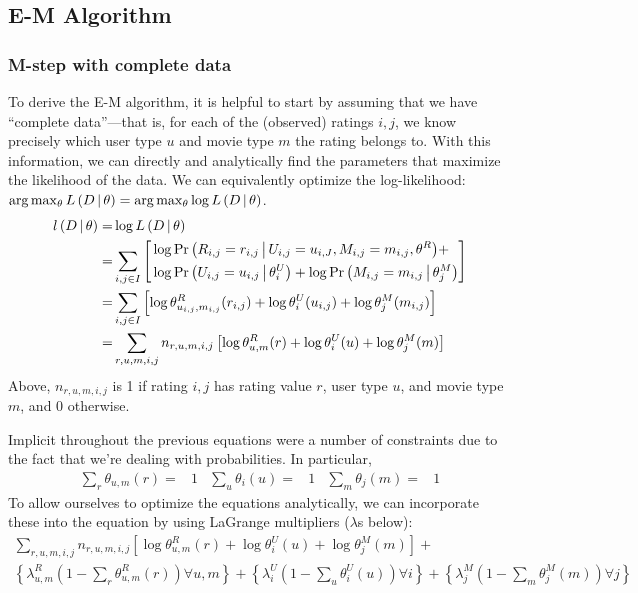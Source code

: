 \documentclass{article}
\begin{document}
\subsection{E-M Algorithm}

\subsubsection{M-step with complete data}

To derive the E-M algorithm, it is helpful to start by assuming that
we have ``complete data''---that is, for each of the (observed)
ratings $i,j$, we know precisely which user type $u$ and movie type
$m$ the rating belongs to. With this information, we can directly and
analytically find the parameters that maximize the likelihood of the
data. We can equivalently optimize the log-likelihood: $\arg
\max_\theta {\ensuremath{ L \left( D \,\middle|\, \theta \right) }} = \arg \max_\theta \log {\ensuremath{ L \left( D \,\middle|\, \theta \right) }}$.
\begin{align}
  {\ensuremath{ l \left( D \,\middle|\, \theta \right) }} =& \log {\ensuremath{ L \left( D \,\middle|\, \theta \right) }} \\
  =& \sum_{i,j \in I} \left[
    \begin{aligned}
      & \log {{\Pr \left(  R_{i,j} = r_{i,j} \,\middle|\, U_{i,j} = u_{i,J}, M_{i,j} = m_{i,j},
        \theta^R  \right)}} + \\
      & \log {{\Pr \left(  U_{i,j} = u_{i,j} \,\middle|\, \theta^U_i  \right)}} +  \log {{\Pr \left(  M_{i,j} = m_{i,j} \,\middle|\, \theta^M_j  \right)}}
    \end{aligned}
  \right] \\
  =& \sum_{i,j \in I} \left[
    \log \theta^R_{u_{i,j},m_{i,j}}(r_{i,j}) +
    \log \theta^U_i(u_{i,j}) +
    \log \theta^M_j(m_{i,j})
  \right] \\
  =& \sum_{r,u,m,i,j} n_{r,u,m,i,j} \left[
    \log \theta^R_{u,m}(r) + \log \theta^U_i(u) + \log \theta^M_j(m)
  \right]
\end{align}
Above, $n_{r,u,m,i,j}$ is 1 if rating $i,j$ has rating value $r$, user
type $u$, and movie type $m$, and 0 otherwise.

Implicit throughout the previous equations were a number of
constraints due to the fact that we're dealing with probabilities. In
particular,
\begin{align}
\sum_r \theta_{u,m}(r) =& 1 &
\sum_u \theta_i(u) =& 1 &
\sum_m \theta_j(m) =& 1
\end{align}
To allow ourselves to optimize the equations analytically, we can
incorporate these into the equation by using LaGrange multipliers
($\lambda$s below):
\begin{multline}
  \sum_{r,u,m,i,j} n_{r,u,m,i,j} \left[
    \log \theta^R_{u,m}(r) + \log \theta^U_i(u) + \log \theta^M_j(m)
  \right] + \\
  \left\{
    \lambda^R_{u,m} \left( 1 - \sum_r \theta^R_{u,m}(r) \right)
    \forall u,m 
  \right\} +
  \left\{
    \lambda^U_i \left( 1 - \sum_u \theta^U_i(u) \right)
    \forall i 
  \right\} +
  \left\{
    \lambda^M_j \left( 1 - \sum_m \theta^M_j(m) \right)
    \forall j
  \right\}
\end{multline}
\end{document}
